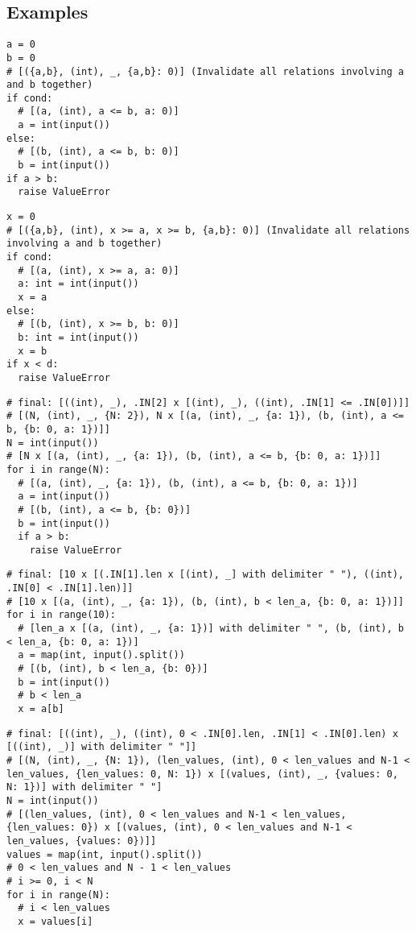 \documentclass[11pt]{article}
\begin{document}
\subsection{Examples}

\begin{lstlisting}
a = 0
b = 0
# [({a,b}, (int), _, {a,b}: 0)] (Invalidate all relations involving a and b together)
if cond:
  # [(a, (int), a <= b, a: 0)]
  a = int(input())
else:
  # [(b, (int), a <= b, b: 0)]
  b = int(input())
if a > b:
  raise ValueError
\end{lstlisting}

\begin{lstlisting}
x = 0
# [({a,b}, (int), x >= a, x >= b, {a,b}: 0)] (Invalidate all relations involving a and b together)
if cond:
  # [(a, (int), x >= a, a: 0)]
  a: int = int(input())
  x = a
else:
  # [(b, (int), x >= b, b: 0)]
  b: int = int(input())
  x = b
if x < d:
  raise ValueError
\end{lstlisting}

\begin{lstlisting}
# final: [((int), _), .IN[2] x [(int), _), ((int), .IN[1] <= .IN[0])]]
# [(N, (int), _, {N: 2}), N x [(a, (int), _, {a: 1}), (b, (int), a <= b, {b: 0, a: 1})]]
N = int(input())
# [N x [(a, (int), _, {a: 1}), (b, (int), a <= b, {b: 0, a: 1})]]
for i in range(N):
  # [(a, (int), _, {a: 1}), (b, (int), a <= b, {b: 0, a: 1})]
  a = int(input())
  # [(b, (int), a <= b, {b: 0})]
  b = int(input())
  if a > b:
    raise ValueError
\end{lstlisting}

\begin{lstlisting}
# final: [10 x [(.IN[1].len x [(int), _] with delimiter " "), ((int), .IN[0] < .IN[1].len)]]
# [10 x [(a, (int), _, {a: 1}), (b, (int), b < len_a, {b: 0, a: 1})]]
for i in range(10):
  # [len_a x [(a, (int), _, {a: 1})] with delimiter " ", (b, (int), b < len_a, {b: 0, a: 1})]
  a = map(int, input().split())
  # [(b, (int), b < len_a, {b: 0})]
  b = int(input())
  # b < len_a
  x = a[b]
\end{lstlisting}

\begin{lstlisting}
# final: [((int), _), ((int), 0 < .IN[0].len, .IN[1] < .IN[0].len) x [((int), _)] with delimiter " "]]
# [(N, (int), _, {N: 1}), (len_values, (int), 0 < len_values and N-1 < len_values, {len_values: 0, N: 1}) x [(values, (int), _, {values: 0, N: 1})] with delimiter " "]
N = int(input())
# [(len_values, (int), 0 < len_values and N-1 < len_values, {len_values: 0}) x [(values, (int), 0 < len_values and N-1 < len_values, {values: 0})]]
values = map(int, input().split())
# 0 < len_values and N - 1 < len_values
# i >= 0, i < N
for i in range(N):
  # i < len_values
  x = values[i]
\end{lstlisting}
\end{document}
